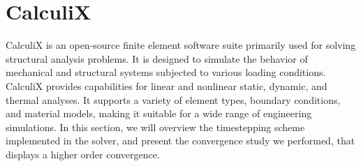 \documentclass[
  english,        %
  font=times,     %
  onecolumn,      %
]{tumarticle}
\begin{document}
\section{CalculiX}\label{sec:calculix}
CalculiX is an open-source finite element software suite primarily used for solving structural analysis problems. It is designed to simulate the behavior of mechanical and structural systems subjected to various loading conditions. CalculiX provides capabilities for linear and nonlinear static, dynamic, and thermal analyses. It supports a variety of element types, boundary conditions, and material models, making it suitable for a wide range of engineering simulations. In this section, we will overview the timestepping scheme implemented in the solver, and present the convergence study we performed, that displays a higher order convergence. 
\end{document}
